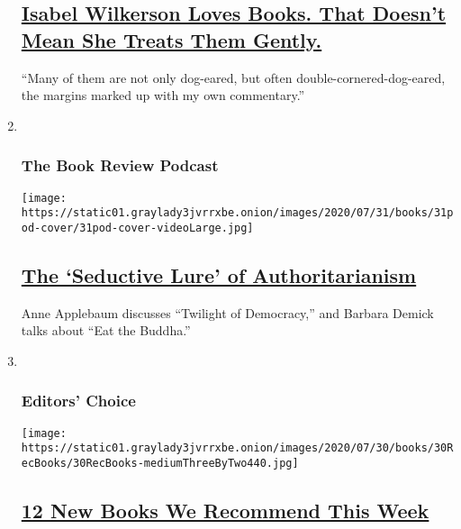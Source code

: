 \begin{enumerate}
{  \subsection{\texorpdfstring{\href{/2020/07/30/books/review/isabel-wilkerson-by-the-book-interview.html}{Isabel
  Wilkerson Loves Books. That Doesn't Mean She Treats Them
  Gently.}}{Isabel Wilkerson Loves Books. That Doesn't Mean She Treats Them Gently.}}\label{isabel-wilkerson-loves-books-that-doesnt-mean-she-treats-them-gently}}

  ``Many of them are not only dog-eared, but often
  double-cornered-dog-eared, the margins marked up with my own
  commentary.''
\item ~
  \hypertarget{the-book-review-podcast}{%
  \subsubsection{The Book Review
  Podcast}\label{the-book-review-podcast}}

  \texttt{[image: https://static01.graylady3jvrrxbe.onion/images/2020/07/31/books/31pod-cover/31pod-cover-videoLarge.jpg]}

  \hypertarget{the-seductive-lure-of-authoritarianism}{%
  \subsection{\texorpdfstring{\href{/2020/07/31/books/review/podcast-twilight-democracy-anne-applebaum-eat-buddha-barbara-demick.html}{The
  `Seductive Lure' of
  Authoritarianism}}{The `Seductive Lure' of Authoritarianism}}\label{the-seductive-lure-of-authoritarianism}}

  Anne Applebaum discusses ``Twilight of Democracy,'' and Barbara Demick
  talks about ``Eat the Buddha.''
\item ~
  \hypertarget{editors-choice}{%
  \subsubsection{Editors' Choice}\label{editors-choice}}

  \texttt{[image: https://static01.graylady3jvrrxbe.onion/images/2020/07/30/books/30RecBooks/30RecBooks-mediumThreeByTwo440.jpg]}

  \hypertarget{12-new-books-we-recommend-this-week}{%
  \subsection{\texorpdfstring{\href{/2020/07/30/books/review/12-new-books-we-recommend-this-week.html}{12
  New Books We Recommend This
  Week}}{12 New Books We Recommend This Week}}\label{12-new-books-we-recommend-this-week}}


\end{enumerate}

